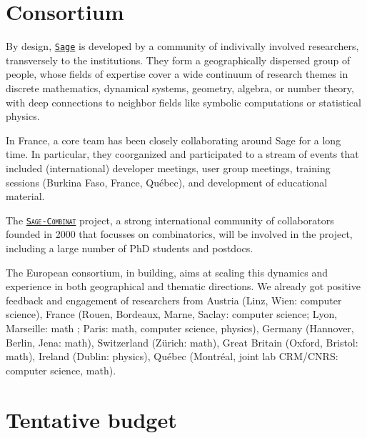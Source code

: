\documentclass[a4,12pt]{amsart}
\newcommand{\sage}{\href{http://www.sagemath.org/}{\texttt{Sage}}\xspace}
\newcommand{\sagecombinat}{\href{http://wiki.sagemath.org/combinat/}{\texttt{Sage-Combinat}}\xspace}
\newcommand{\TODO}[2][To do: ]{}
\newcommand{\CS}{computer science}
\begin{document}
\TODO{Reuse stuff from the NSF grant}

\section{Consortium}

By design, \sage{} is developed by a community of indivivally involved
researchers, transversely to the institutions. They form a geographically
dispersed group of people, whose fields of expertise cover a wide continuum of
research themes in discrete mathematics, dynamical systems, geometry, algebra,
or number theory, with deep connections to neighbor fields like symbolic
computations or statistical physics.
%
%


In France, a core team has been closely collaborating around Sage for a long time.
In particular, they coorganized and participated to a stream of events that
included (international) developer meetings, user group meetings, training
sessions (Burkina Faso, France, Québec), and development of educational
material.

The \textsc{\sagecombinat} project, a strong international community of
collaborators founded in 2000 that focusses on combinatorics, will be involved
in the project, including a large number of PhD students and postdocs.

The European consortium, in building, aims at scaling this dynamics and
experience in both geographical and thematic directions.
%
We already got positive feedback and engagement of researchers from Austria
(Linz, Wien: \CS), France (Rouen, Bordeaux, Marne, Saclay: \CS ; Lyon,
Marseille: math ; Paris: math, \CS, physics), Germany (Hannover, Berlin, Jena:
math), Switzerland (Zürich: math), Great Britain (Oxford, Bristol: math),
Ireland (Dublin: physics), Québec (Montréal, joint lab CRM/CNRS: \CS, math).



\section{Tentative budget}
\end{document}
